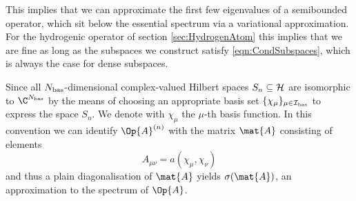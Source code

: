 This implies that we can approximate the first few eigenvalues
of a semibounded operator,
which sit below the essential spectrum via a variational approximation.
For the hydrogenic operator of section \vref{sec:HydrogenAtom}
this implies that we are fine
as long as the subspaces we construct satisfy \eqref{eqn:CondSubspaces},
which is always the case for dense subspaces.

Since all $N_\text{bas}$-dimensional complex-valued Hilbert spaces $S_n \subseteq \mathcal{H}$
are isomorphic to $\C^{\Nbas}$ by the means of choosing an appropriate
basis set $\{\chi_\mu\}_{\mu \in \mathcal{I}_\text{bas}}$ to express the space $S_n$.
We denote with $\chi_\mu$ the $\mu$-th basis function.
In this convention we can identify $\Op{A}^{(n)}$ with the matrix $\mat{A}$
consisting of elements
\[ A_{\mu\nu} = a(\chi_\mu, \chi_\nu) \]
and thus a plain diagonalisation of $\mat{A}$ yields $\sigma(\mat{A})$,
an approximation to the spectrum of $\Op{A}$.

